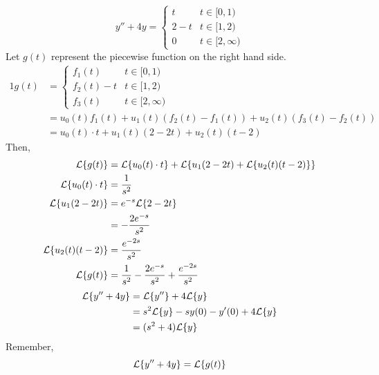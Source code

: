 \documentclass[diffeq.tex]{subfiles}
\begin{document}
    \begin{example}
        \begin{equation}
            y'' + 4y = \begin{cases}
                t & t \in [0, 1)\\
                2 - t & t \in [1, 2)\\
                0 & t \in [2, \infty)
            \end{cases}
        \end{equation}
        Let $g(t)$ represent the piecewise function on the right hand side.
        \begin{alignat}{1}
            g(t) &= \begin{cases}
                f_{1}(t) & t \in [0, 1)\\
                f_{2}(t) - t & t \in [1, 2)\\
                f_{3}(t) & t \in [2, \infty)
            \end{cases}\\
            &= u_{0}(t)f_{1}(t) + u_{1}(t)\left(f_{2}(t) - f_{1}(t)\right) + u_{2}(t)\left(f_{3}(t) - f_{2}(t)\right)\\
            &= u_{0}(t)\cdot t + u_{1}(t)(2 - 2t) + u_{2}(t)(t - 2)
        \end{alignat}
        Then,
        \begin{alignat}{1}
            \mathcal{L}\{g(t)\} &= \mathcal{L}\{u_{0}(t)\cdot t\} + \mathcal{L}\{u_{1}(2 - 2t) + \mathcal{L}\{u_{2}(t)(t - 2)\}\}\\
            \mathcal{L}\{u_{0}(t)\cdot t\} &= \frac{1}{s^{2}}\\
            \mathcal{L}\{u_{1}(2 - 2t)\} &= e^{-s}\mathcal{L}\{2-2t\}\\
            &= -\frac{2e^{-s}}{s^{2}}\\
            \mathcal{L}\{u_{2}(t)(t - 2)\} &= \frac{e^{-2s}}{s^{2}}\\
            \mathcal{L}\{g(t)\} &= \frac{1}{s^{2}} - \frac{2e^{-s}}{s^{2}} + \frac{e^{-2s}}{s^{2}}\\
        \end{alignat}
        \begin{alignat}{1}
            \mathcal{L}\{y'' + 4y\} &= \mathcal{L}\{y''\} + 4\mathcal{L}\{y\}\\
            &= s^{2}\mathcal{L}\{y\}-sy(0)-y'(0)+4\mathcal{L}\{y\}\\
            &= (s^{2} + 4)\mathcal{L}\{y\}
        \end{alignat}
        Remember,
        \begin{equation}
            \mathcal{L}\{y'' + 4y\} = \mathcal{L}\{g(t)\}
        \end{equation}

\end{example}
\end{document}
